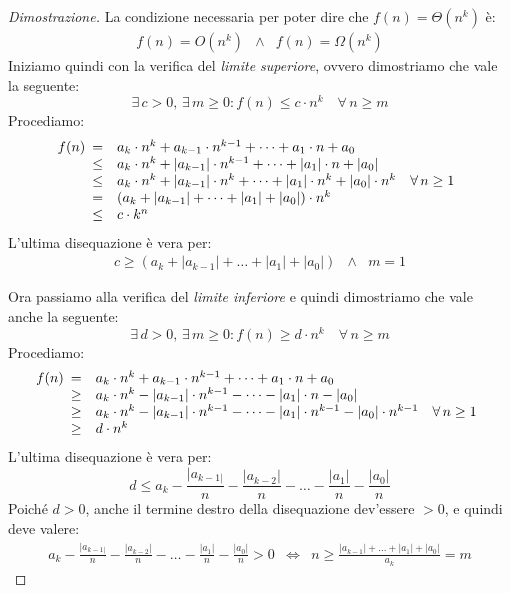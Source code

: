 \begin{proof}[Dimostrazione]
    La condizione necessaria per poter dire che $f(n)=\Theta(n^k)$ è:
    \[\begin{array}{rcl}
        f(n)=O(n^k) & \wedge & f(n)=\Omega(n^k)
    \end{array}\]
    Iniziamo quindi con la verifica del \emph{limite superiore}, ovvero dimostriamo
    che vale la seguente:
    \[\exists\,c>0,\,\exists\,m\geq 0:f(n)\leq c\cdot n^k\quad\forall\,n\geq m\]
    Procediamo:
    \[f(n)\begin{array}[t]{clr}
        = & a_k\cdot n^k+a_{k-1}\cdot n^{k-1}+\dots+a_1\cdot n+a_0 & \\
        \leq & a_k\cdot n^k+|a_{k-1}|\cdot n^{k-1}+\dots+|a_1|\cdot n+|a_0| & \\
        \leq & a_k\cdot n^k+|a_{k-1}|\cdot n^k+\dots+|a_1|\cdot n^k+|a_0|\cdot n^k & \forall\,n\geq 1\\
        = & (a_k+|a_{k-1}|+\dots+|a_1|+|a_0|)\cdot n^k & \\
        \leq & c\cdot k^n
    \end{array}\]
    L'ultima disequazione è vera per:
    \[\begin{array}{rcl}
        c\geq(a_k+|a_{k-1}|+\dots+|a_1|+|a_0|) & \wedge & m=1
    \end{array}\]

    \bigskip\noindent
    Ora passiamo alla verifica del \emph{limite inferiore} e quindi dimostriamo
    che vale anche la seguente:
    \[\exists\,d>0,\,\exists\,m\geq 0:f(n)\geq d\cdot n^k\quad\forall\,n\geq m\]
    Procediamo:
    \[f(n)\begin{array}[t]{clr}
        = & a_k\cdot n^k+a_{k-1}\cdot n^{k-1}+\dots+a_1\cdot n+a_0 & \\
        \geq & a_k\cdot n^k-|a_{k-1}|\cdot n^{k-1}-\dots-|a_1|\cdot n-|a_0| & \\
        \geq & a_k\cdot n^k-|a_{k-1}|\cdot n^{k-1}-\dots-|a_1|\cdot n^{k-1}-|a_0|\cdot n^{k-1} & \forall\,n\geq 1\\
        \geq & d\cdot n^k
    \end{array}\]
    L'ultima disequazione è vera per:
    \[d\leq a_k-\frac{|a_{k-1|}}{n}-\frac{|a_{k-2}|}{n}-\dots-\frac{|a_1|}{n}-
    \frac{|a_0|}{n}\]
    Poiché $d>0$, anche il termine destro della disequazione dev'essere $>0$,
    e quindi deve valere:
    \[\begin{array}{rcl}
        a_k-\frac{|a_{k-1|}}{n}-\frac{|a_{k-2}|}{n}-\dots-\frac{|a_1|}{n}-
    \frac{|a_0|}{n} > 0 & \Leftrightarrow & n\geq\frac{|a_{k-1}|+\dots+|a_1|+|a_0|}
    {a_k}=m
    \end{array}\]
\end{proof}

